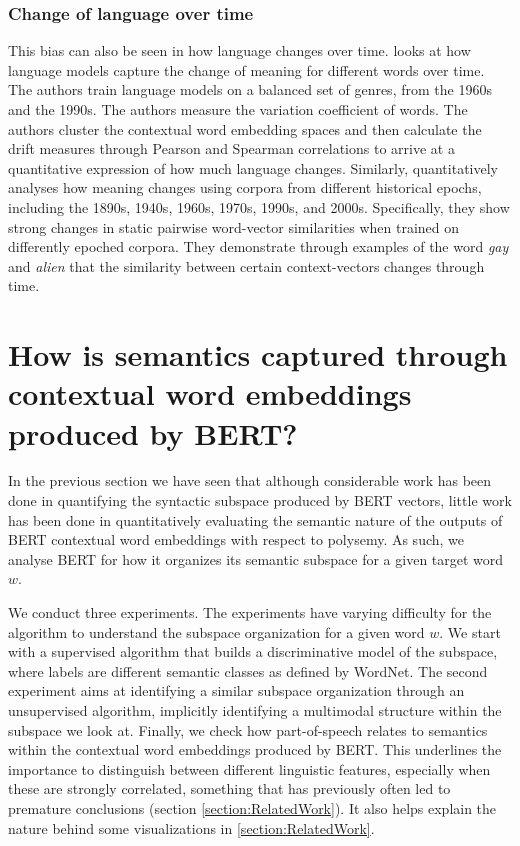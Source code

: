 \documentclass[a4paper,12pt,oneside,openright]{report}
\begin{document}
\subsection{Change of language over time}

This bias can also be seen in how language changes over time. \cite{martinc20} looks at how language models capture the change of meaning for different words over time.
The authors train language models on a balanced set of genres, from the 1960s and the 1990s.
The authors measure the variation coefficient of words.
The authors cluster the contextual word embedding spaces and then calculate the drift measures through Pearson and Spearman correlations to arrive at a quantitative expression of how much language changes.
Similarly, \cite{hu19} quantitatively analyses how meaning changes using corpora from different historical epochs, including the 1890s, 1940s, 1960s, 1970s, 1990s, and 2000s. 
Specifically, they show strong changes in static pairwise word-vector similarities when trained on differently epoched corpora.
They demonstrate through examples of the word \textit{gay} and \textit{alien} that the similarity between certain context-vectors changes through time.

\chapter{How is semantics captured through contextual word embeddings produced by BERT?}\label{section:Understand_BERT}\label{section:UnderstandingBERT} 

In the previous section we have seen that although considerable work has been done in quantifying the syntactic subspace produced by BERT vectors, little work has been done in quantitatively evaluating the semantic nature of the outputs of BERT contextual word embeddings with respect to polysemy.
As such, we analyse BERT for how it organizes its semantic subspace for a given target word $w$.

We conduct three experiments.
The experiments have varying difficulty for the algorithm to understand the subspace organization for a given word $w$.
We start with a supervised algorithm that builds a discriminative model of the subspace, where labels are different semantic classes as defined by WordNet.
The second experiment aims at identifying a similar subspace organization through an unsupervised algorithm, implicitly identifying a multimodal structure within the subspace we look at.
Finally, we check how part-of-speech relates to semantics within the contextual word embeddings produced by BERT. 
This underlines the importance to distinguish between different linguistic features, especially when these are strongly correlated, something that has previously often led to premature conclusions (section \ref{section:RelatedWork}). 
It also helps explain the nature behind some visualizations in \ref{section:RelatedWork}.
\end{document}
